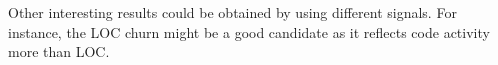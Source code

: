 Other interesting results could be obtained by using different signals. For
instance, the LOC churn might be a good candidate as it reflects code activity
more than LOC.

\begin{comment}
- Analyse results
- Conclude and interpret results
- Answer hypotheses and research questions
- Threats to validity
- Discussion
- Future work
 
This chapter contains the analysis and interpretation of the results. The
research questions are answered as best as possible given the results that were
obtained. The analysis also discussed parts of the questions that were left
unanswered.

An important topic is the validity of the results.
What methods of validation were used?
Could the results be generalized to other cases?
What threats to validity can be identified?

There is room here to discuss the results of related scientific literature here
as well.
How do the results obtained here relate to other work, and what consequences are
there?
Did your approach work better or worse?
Did you learn anything new compared to the already existing body of knowledge?
Finally, what could you say in hindsight on the research approach by followed?
What could have done better?
What lessons have been learned?
What could other researchers use from your experience?

A separate section should be devoted to ‘future work,’ i.e., possible extension
points of your work that you have identified. Other researchers (or yourself)
could use those as a starting point.

Refer to Chapters 3.7 and 4 in this example thesis at Paul’s
homepage\footnote{http://homepages.cwi.nl/~paulk/thesesMasterSoftwareEngineering/2006/ReneWiegers.pdf}.
\end{comment}
